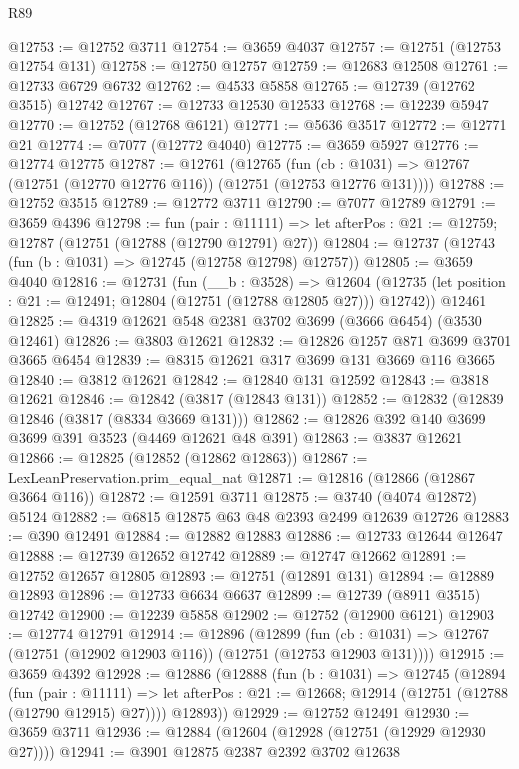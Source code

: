 \begin{lexlean}{R89}
\begin{coremodule}
@12753 := @12752 @3711
@12754 := @3659 @4037
@12757 := @12751 (@12753 @12754 @131)
@12758 := @12750 @12757
@12759 := @12683 @12508
@12761 := @12733 @6729 @6732
@12762 := @4533 @5858
@12765 := @12739 (@12762 @3515) @12742
@12767 := @12733 @12530 @12533
@12768 := @12239 @5947
@12770 := @12752 (@12768 @6121)
@12771 := @5636 @3517
@12772 := @12771 @21
@12774 := @7077 (@12772 @4040)
@12775 := @3659 @5927
@12776 := @12774 @12775
@12787 := @12761
    (@12765
      (fun (cb : @1031) => @12767 (@12751 (@12770 @12776 @116)) (@12751 (@12753 @12776 @131))))
@12788 := @12752 @3515
@12789 := @12772 @3711
@12790 := @7077 @12789
@12791 := @3659 @4396
@12798 := fun (pair : @11111) =>
  let afterPos : @21 := @12759; @12787 (@12751 (@12788 (@12790 @12791) @27))
@12804 := @12737 (@12743 (fun (b : @1031) => @12745 (@12758 @12798) @12757))
@12805 := @3659 @4040
@12816 := @12731
    (fun (__b : @3528) =>
    @12604 (@12735 (let position : @21 := @12491; @12804 (@12751 (@12788 @12805 @27))) @12742))
    @12461
@12825 := @4319 @12621 @548 @2381 @3702 @3699 (@3666 @6454) (@3530 @12461)
@12826 := @3803 @12621
@12832 := @12826 @1257 @871 @3699 @3701 @3665 @6454
@12839 := @8315 @12621 @317 @3699 @131 @3669 @116 @3665
@12840 := @3812 @12621
@12842 := @12840 @131 @12592
@12843 := @3818 @12621
@12846 := @12842 (@3817 (@12843 @131))
@12852 := @12832 (@12839 @12846 (@3817 (@8334 @3669 @131)))
@12862 := @12826 @392 @140 @3699 @3699 @391 @3523 (@4469 @12621 @48 @391)
@12863 := @3837 @12621
@12866 := @12825 (@12852 (@12862 @12863))
@12867 := LexLeanPreservation.prim_equal_nat
@12871 := @12816 (@12866 (@12867 @3664 @116))
@12872 := @12591 @3711
@12875 := @3740 (@4074 @12872) @5124
@12882 := @6815 @12875 @63 @48 @2393 @2499 @12639 @12726
@12883 := @390 @12491
@12884 := @12882 @12883
@12886 := @12733 @12644 @12647
@12888 := @12739 @12652 @12742
@12889 := @12747 @12662
@12891 := @12752 @12657 @12805
@12893 := @12751 (@12891 @131)
@12894 := @12889 @12893
@12896 := @12733 @6634 @6637
@12899 := @12739 (@8911 @3515) @12742
@12900 := @12239 @5858
@12902 := @12752 (@12900 @6121)
@12903 := @12774 @12791
@12914 := @12896
    (@12899
      (fun (cb : @1031) => @12767 (@12751 (@12902 @12903 @116)) (@12751 (@12753 @12903 @131))))
@12915 := @3659 @4392
@12928 := @12886
    (@12888
      (fun (b : @1031) =>
      @12745
        (@12894
          (fun (pair : @11111) =>
          let afterPos : @21 := @12668; @12914 (@12751 (@12788 (@12790 @12915) @27))))
        @12893))
@12929 := @12752 @12491
@12930 := @3659 @3711
@12936 := @12884 (@12604 (@12928 (@12751 (@12929 @12930 @27))))
@12941 := @3901 @12875 @2387 @2392 @3702 @12638

\end{coremodule}
\end{lexlean}
